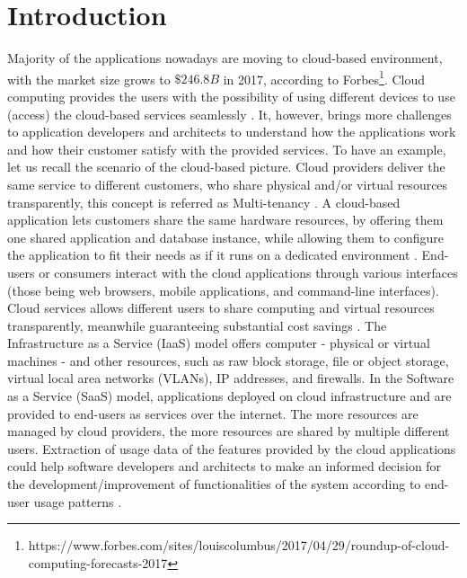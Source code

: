 \section{Introduction}\label{sec:Introduction}
%
Majority of the applications nowadays are moving to cloud-based environment, with the market size grows to $\$246.8B$ in 2017, according to Forbes\footnote{https://www.forbes.com/sites/louiscolumbus/2017/04/29/roundup-of-cloud-computing-forecasts-2017}. Cloud computing provides the users with the possibility of using different devices to use (access) the cloud-based services seamlessly \cite{Mell2011}. It, however, brings more challenges to application developers and architects to understand how the applications work and how their customer satisfy with the provided services. To have an example, let us recall the scenario of the cloud-based picture. Cloud providers deliver the same service to different customers, who share physical and/or virtual resources transparently, this concept is referred as Multi-tenancy \cite{Kabbedijk2015}.  A cloud-based application lets customers share the same hardware resources, by offering them one shared application and database instance, while allowing them to configure the application to fit their needs as if it runs on a dedicated environment \cite{Zaidman2010}. End-users or consumers interact with the cloud applications through various interfaces (those being web browsers, mobile applications, and command-line interfaces). Cloud services allows different users to share computing and virtual resources transparently, meanwhile guaranteeing substantial cost savings \cite{Bezemer2010}. The Infrastructure as a Service (IaaS) model offers computer - physical or virtual machines - and other resources, such as raw block storage, file or object storage, virtual local area networks (VLANs), IP addresses, and firewalls. In the Software as a Service (SaaS) model, applications deployed on cloud infrastructure and are provided to end-users as services over the internet. The more resources are managed by cloud providers, the more resources are shared by multiple different users. Extraction of usage data of the features provided by the cloud applications could help software developers and architects to make an informed decision for the development/improvement of functionalities of the system according to end-user usage patterns \cite{Pachidi2014}. 

